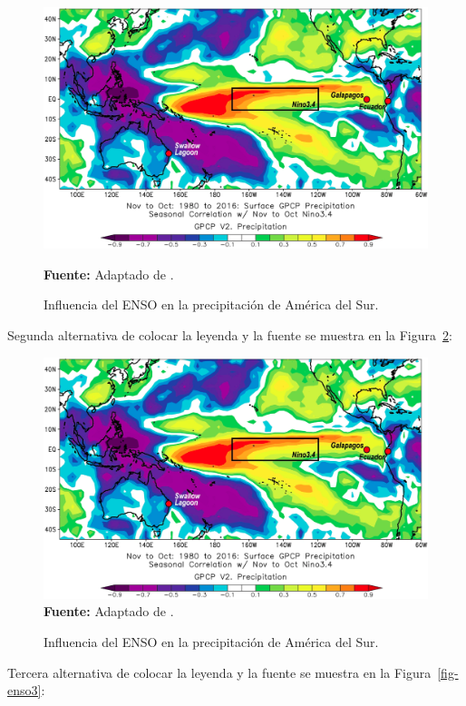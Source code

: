 \begin{figure}[H]
\centering
\includegraphics[width=1.0\textwidth]{Figuras/enso.png}
\vspace{-0.5cm}
\caption{Influencia del ENSO en la precipitación de América del Sur.}
\textbf{Fuente:} Adaptado de \cite{barr2019}.
\label{fig-enso}
\end{figure}

Segunda alternativa de colocar la leyenda y la fuente se muestra en la Figura~\ref{fig-enso2}:


\begin{figure}[H]
\centering
\caption{Influencia del ENSO en la precipitación de América del Sur.}
\includegraphics[width=1.0\textwidth]{Figuras/enso.png}
\vspace{-0.5cm}
\textbf{Fuente:} Adaptado de \cite{barr2019}.
\label{fig-enso2}
\end{figure}

Tercera alternativa de colocar la leyenda y la fuente se muestra en la Figura~\ref{fig-enso3}:

